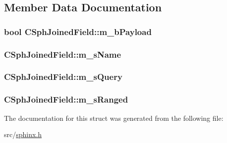 \subsection{Member Data Documentation}
\hypertarget{structCSphJoinedField_a8381223d3fd61c2b9f782890bce7e024}{
\subsubsection[{m\-\_\-b\-Payload}]{\setlength{\rightskip}{0pt plus 5cm}bool C\-Sph\-Joined\-Field\-::m\-\_\-b\-Payload}}\label{structCSphJoinedField_a8381223d3fd61c2b9f782890bce7e024}
\hypertarget{structCSphJoinedField_a352ea93b82bb7c59d80a32ab6fa18d17}{
\subsubsection[{m\-\_\-s\-Name}]{ C\-Sph\-Joined\-Field\-::m\-\_\-s\-Name}}\label{structCSphJoinedField_a352ea93b82bb7c59d80a32ab6fa18d17}
\hypertarget{structCSphJoinedField_a10e549a997c741a2274195882a524b00}{
\subsubsection[{m\-\_\-s\-Query}]{ C\-Sph\-Joined\-Field\-::m\-\_\-s\-Query}}\label{structCSphJoinedField_a10e549a997c741a2274195882a524b00}
\hypertarget{structCSphJoinedField_a58dda308b3e008673fc2f32936dec1d7}{
\subsubsection[{m\-\_\-s\-Ranged}]{ C\-Sph\-Joined\-Field\-::m\-\_\-s\-Ranged}}\label{structCSphJoinedField_a58dda308b3e008673fc2f32936dec1d7}


The documentation for this struct was generated from the following file\-:\begin{DoxyCompactItemize}
\item 
src/\hyperlink{sphinx_8h}{sphinx.\-h}\end{DoxyCompactItemize}
